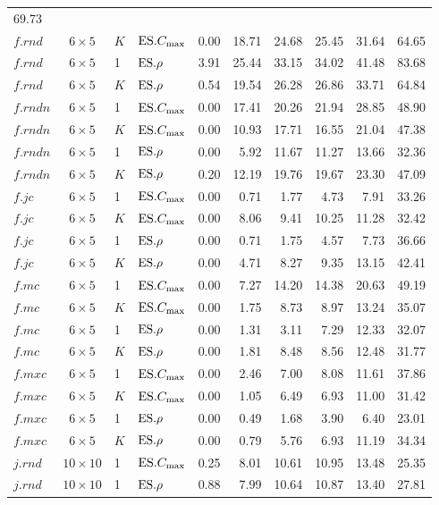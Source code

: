 \begin{table}[b]
{\begin{tabular}{lcllrrrrrr}
69.73 \\ 
$f.rnd$ & $6\times5$ & $K$ & $\text{ES}.{C_{\max}}$ & 0.00 & 18.71 & 24.68 & 25.45 & 31.64 
& 64.65 \\ 
$f.rnd$ & $6\times5$ & 1 & $\text{ES}.{\rho}$ & 3.91 & 25.44 & 33.15 & 34.02 & 41.48 & 
83.68 \\ 
$f.rnd$ & $6\times5$ & $K$ & $\text{ES}.{\rho}$ & 0.54 & 19.54 & 26.28 & 26.86 & 33.71 & 
64.84 \\ \midrule
$f.rndn$ & $6\times5$ & 1 & $\text{ES}.{C_{\max}}$ & 0.00 & 17.41 & 20.26 & 21.94 & 28.85 & 
48.90 \\ 
$f.rndn$ & $6\times5$ & $K$ & $\text{ES}.{C_{\max}}$ & 0.00 & 10.93 & 17.71 & 16.55 & 21.04 
& 47.38 \\ 
$f.rndn$ & $6\times5$ & 1 & $\text{ES}.{\rho}$ & 0.00 & 5.92 & 11.67 & 11.27 & 13.66 & 
32.36 \\ 
$f.rndn$ & $6\times5$ & $K$ & $\text{ES}.{\rho}$ & 0.20 & 12.19 & 19.76 & 19.67 & 23.30 
& 47.09 \\ \midrule
$f.jc$ & $6\times5$ & 1 & $\text{ES}.{C_{\max}}$ & 0.00 & 0.71 & 1.77 & 4.73 & 7.91 & 33.26 
\\ 
$f.jc$ & $6\times5$ & $K$ & $\text{ES}.{C_{\max}}$ & 0.00 & 8.06 & 9.41 & 10.25 & 11.28 & 
32.42 \\ 
$f.jc$ & $6\times5$ & 1 & $\text{ES}.{\rho}$ & 0.00 & 0.71 & 1.75 & 4.57 & 7.73 & 36.66 
\\ 
$f.jc$ & $6\times5$ & $K$ & $\text{ES}.{\rho}$ & 0.00 & 4.71 & 8.27 & 9.35 & 13.15 & 
42.41 \\ \midrule
$f.mc$ & $6\times5$ & 1 & $\text{ES}.{C_{\max}}$ & 0.00 & 7.27 & 14.20 & 14.38 & 20.63 & 
49.19 \\ 
$f.mc$ & $6\times5$ & $K$ & $\text{ES}.{C_{\max}}$ & 0.00 & 1.75 & 8.73 & 8.97 & 13.24 & 
35.07 \\ 
$f.mc$ & $6\times5$ & 1 & $\text{ES}.{\rho}$ & 0.00 & 1.31 & 3.11 & 7.29 & 12.33 & 32.07 
\\ 
$f.mc$ & $6\times5$ & $K$ & $\text{ES}.{\rho}$ & 0.00 & 1.81 & 8.48 & 8.56 & 12.48 & 
31.77 \\ \midrule
$f.mxc$ & $6\times5$ & 1 & $\text{ES}.{C_{\max}}$ & 0.00 & 2.46 & 7.00 & 8.08 & 11.61 & 
37.86 \\ 
$f.mxc$ & $6\times5$ & $K$ & $\text{ES}.{C_{\max}}$ & 0.00 & 1.05 & 6.49 & 6.93 & 11.00 & 
31.42 \\ 
$f.mxc$ & $6\times5$ & 1 & $\text{ES}.{\rho}$ & 0.00 & 0.49 & 1.68 & 3.90 & 6.40 & 23.01 
\\ 
$f.mxc$ & $6\times5$ & $K$ & $\text{ES}.{\rho}$ & 0.00 & 0.79 & 5.76 & 6.93 & 11.19 & 
34.34 \\ \midrule
$j.rnd$ & $10\times10$ & 1 & $\text{ES}.{C_{\max}}$ & 0.25 & 8.01 & 10.61 & 10.95 & 13.48 & 
25.35 \\ 
$j.rnd$ & $10\times10$ & 1 & $\text{ES}.{\rho}$ & 0.88 & 7.99 & 10.64 & 10.87 & 13.40 & 
27.81 \\ 
\bottomrule
\end{tabular}}
\end{table}


